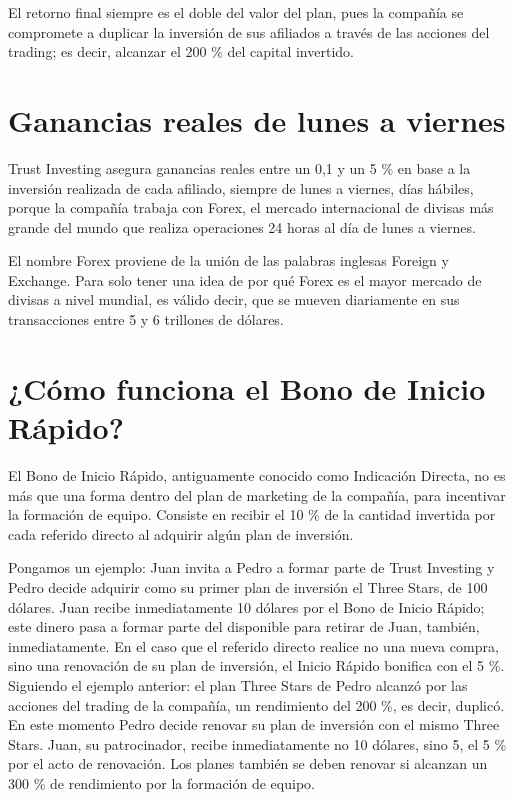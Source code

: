 \documentclass[12pt,letterpaper]{article}
\begin{document}
El retorno final siempre es el doble del valor del plan, pues la compañía se compromete a duplicar la inversión de sus afiliados a través de las acciones del trading; es decir, alcanzar el 200 \% del capital invertido.

\section{Ganancias reales de lunes a viernes}
Trust Investing asegura ganancias reales entre un 0,1 y un 5 \% en base a la inversión realizada de cada afiliado, siempre de lunes a viernes, días hábiles, porque la compañía trabaja con Forex, el mercado internacional de divisas más grande del mundo que realiza operaciones 24 horas al día de lunes a viernes.

El nombre Forex proviene de la unión de las palabras inglesas Foreign y Exchange. Para solo tener una idea de por qué Forex es el mayor mercado de divisas a nivel mundial, es válido decir, que se mueven diariamente en sus transacciones entre 5 y 6 trillones de dólares.

\section{¿Cómo funciona el Bono de Inicio Rápido?}
El Bono de Inicio Rápido, antiguamente conocido como Indicación Directa, no es más que una forma dentro del plan de marketing de la compañía, para incentivar la formación de equipo. Consiste en recibir el 10 \% de la cantidad invertida por cada referido directo al adquirir algún plan de inversión.

Pongamos un ejemplo: Juan invita a Pedro a formar parte de Trust Investing y Pedro decide adquirir como su primer plan de inversión el Three Stars, de 100 dólares. Juan recibe inmediatamente 10 dólares por el Bono de Inicio Rápido; este dinero pasa a formar parte del disponible para retirar de Juan, también, inmediatamente. En el caso que el referido directo realice no una nueva compra, sino una renovación de su plan de inversión, el Inicio Rápido bonifica con el 5 \%. Siguiendo el ejemplo anterior: el plan Three Stars de Pedro alcanzó por las acciones del trading de la compañía, un rendimiento del 200 \%, es decir, duplicó. En este momento Pedro decide renovar su plan de inversión con el mismo Three Stars. Juan, su patrocinador, recibe inmediatamente no 10 dólares, sino 5, el 5 \% por el acto de renovación. Los planes también se deben renovar si alcanzan un 300 \% de rendimiento por la formación de equipo.
\end{document}
